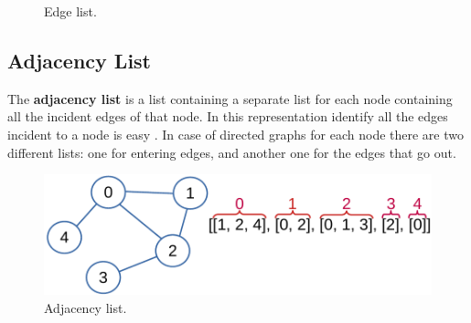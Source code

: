 \begin{figure}[H]
\centering
{}  
\caption[Edge list.]{Edge list.}
\label{graphs_3}
\end{figure}

\subsection{Adjacency List}
The \textbf{adjacency list} is a list containing a separate list for each node containing all the incident edges of that node. In this representation identify all the edges incident to a node is easy \cite{goodrich2013data}. In case of directed graphs for each node there are two different lists: one for entering edges, and another one for the edges that go out.

\begin{figure}[H]
	\begin{center}
		\includegraphics[scale=.6]{chapters/graphs/images/graphs_4.pdf}
		\caption[Adjacency list.]{Adjacency list.}
		\label{graphs_4}
	\end{center}
\end{figure}

